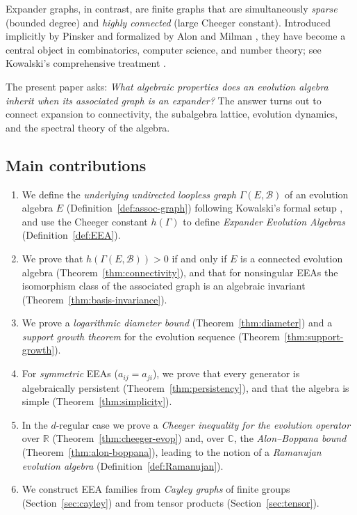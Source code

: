 \documentclass[12pt,a4paper]{amsart}
\theoremstyle{definition}
\newcommand{\R}{\mathbb{R}}
\newcommand{\C}{\mathbb{C}}
\newcommand{\hh}{h}          %
\newcommand{\EA}{E}          %
\newcommand{\natbasis}{\mathcal{B}}  %
\begin{document}
Expander graphs, in contrast, are finite graphs that are simultaneously
\emph{sparse} (bounded degree) and \emph{highly connected}
(large Cheeger constant).  Introduced implicitly by Pinsker \cite{Pinsker1973}
and formalized by Alon and Milman \cite{AlonMilman1985}, they have
become a central object in combinatorics, computer science, and number
theory; see Kowalski's comprehensive treatment \cite{Kowalski2019}.

The present paper asks: \emph{What algebraic properties does an
evolution algebra inherit when its associated graph is an expander?}
The answer turns out to connect expansion to connectivity, the subalgebra lattice,
evolution dynamics, and the spectral theory of the algebra.

\subsection*{Main contributions}

\begin{enumerate}[label=(\arabic*)]
\item We define the \emph{underlying undirected loopless graph}
      $\varGamma(\EA,\natbasis)$ of an evolution algebra $\EA$
      (Definition~\ref{def:assoc-graph}) following Kowalski's formal
      setup \cite[Definition~2.1.1]{Kowalski2019}, and use the
      Cheeger constant $\hh(\varGamma)$
      \cite[Definition~3.1.1]{Kowalski2019} to define
      \emph{Expander Evolution Algebras} (Definition~\ref{def:EEA}).

\item We prove that $\hh(\varGamma(\EA,\natbasis))>0$ if and only if
      $\EA$ is a connected evolution algebra
      (Theorem~\ref{thm:connectivity}), and that for nonsingular EEAs
      the isomorphism class of the associated graph is an algebraic
      invariant (Theorem~\ref{thm:basis-invariance}).

\item We prove a \emph{logarithmic diameter bound}
      (Theorem~\ref{thm:diameter}) and a \emph{support growth theorem}
      for the evolution sequence (Theorem~\ref{thm:support-growth}).

\item For \emph{symmetric} EEAs ($a_{ij}=a_{ji}$), we prove that every
      generator is algebraically persistent
      (Theorem~\ref{thm:persistency}), and that the algebra is simple
      (Theorem~\ref{thm:simplicity}).

\item In the $d$-regular case we prove a \emph{Cheeger inequality for
      the evolution operator} over $\R$
      (Theorem~\ref{thm:cheeger-evop}) and, over $\C$, the
      \emph{Alon--Boppana bound} (Theorem~\ref{thm:alon-boppana}),
      leading to the notion of a \emph{Ramanujan evolution algebra}
      (Definition~\ref{def:Ramanujan}).

\item We construct EEA families from \emph{Cayley graphs} of finite
      groups (Section~\ref{sec:cayley}) and from tensor products
      (Section~\ref{sec:tensor}).
\end{enumerate}
\end{document}
